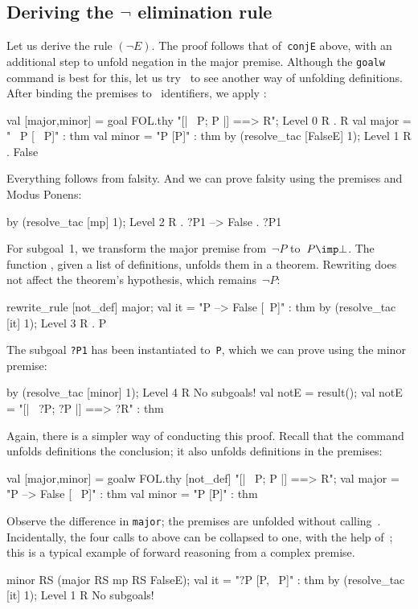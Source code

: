 \subsection{Deriving the $\neg$ elimination rule}
Let us derive the rule $(\neg E)$.  The proof follows that of~{\tt conjE}
above, with an additional step to unfold negation in the major premise.
Although the {\tt goalw} command is best for this, let us
try~ to see another way of unfolding definitions.  After
binding the premises to \ML\ identifiers, we apply :
\begin{ttbox}
val [major,minor] = goal FOL.thy "[| ~P;  P |] ==> R";
{\out Level 0}
{\out R}
{. R}
{\out val major = "~ P  [~ P]" : thm}
{\out val minor = "P  [P]" : thm}
\ttbreak
by (resolve_tac [FalseE] 1);
{\out Level 1}
{\out R}
{. False}
\end{ttbox}
Everything follows from falsity.  And we can prove falsity using the
premises and Modus Ponens:
\begin{ttbox}
by (resolve_tac [mp] 1);
{\out Level 2}
{\out R}
{. ?P1 --> False}
{. ?P1}
\end{ttbox}
For subgoal~1, we transform the major premise from~$\neg P$
to~${P\imp\bot}$.  The function , given a list of
definitions, unfolds them in a theorem.  Rewriting does not
affect the theorem's hypothesis, which remains~$\neg P$:
\begin{ttbox}
rewrite_rule [not_def] major;
{\out val it = "P --> False  [~P]" : thm}
by (resolve_tac [it] 1);
{\out Level 3}
{\out R}
{. P}
\end{ttbox}
The subgoal {\tt?P1} has been instantiated to~{\tt P}, which we can prove
using the minor premise:
\begin{ttbox}
by (resolve_tac [minor] 1);
{\out Level 4}
{\out R}
{\out No subgoals!}
val notE = result();
{\out val notE = "[| ~?P; ?P |] ==> ?R" : thm}
\end{ttbox}

\medskip
Again, there is a simpler way of conducting this proof.  Recall that
the  command unfolds definitions the conclusion; it also
unfolds definitions in the premises:
\begin{ttbox}
val [major,minor] = goalw FOL.thy [not_def]
    "[| ~P;  P |] ==> R";
{\out val major = "P --> False  [~ P]" : thm}
{\out val minor = "P  [P]" : thm}
\end{ttbox}
Observe the difference in {\tt major}; the premises are unfolded without
calling~.  Incidentally, the four calls to
 above can be collapsed to one, with the help
of~; this is a typical example of forward reasoning from a
complex premise.
\begin{ttbox}
minor RS (major RS mp RS FalseE);
{\out val it = "?P  [P, ~P]" : thm}
by (resolve_tac [it] 1);
{\out Level 1}
{\out R}
{\out No subgoals!}
\end{ttbox}

